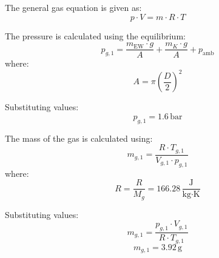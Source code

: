 The general gas equation is given as:  
\[
p \cdot V = m \cdot R \cdot T
\]  

The pressure is calculated using the equilibrium:  
\[
p_{g,1} = \frac{m_{\text{EW}} \cdot g}{A} + \frac{m_K \cdot g}{A} + p_{\text{amb}}
\]  
where:  
\[
A = \pi \left( \frac{D}{2} \right)^2
\]  

Substituting values:  
\[
p_{g,1} = 1.6 \, \text{bar}
\]  

The mass of the gas is calculated using:  
\[
m_{g,1} = \frac{R \cdot T_{g,1}}{V_{g,1} \cdot p_{g,1}}
\]  
where:  
\[
R = \frac{R}{M_g} = 166.28 \, \frac{\text{J}}{\text{kg·K}}
\]  

Substituting values:  
\[
m_{g,1} = \frac{p_{g,1} \cdot V_{g,1}}{R \cdot T_{g,1}}
\]  
\[
m_{g,1} = 3.92 \, \text{g}
\]